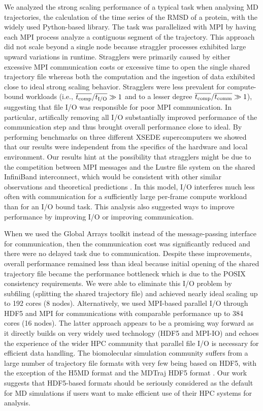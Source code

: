 \label{concl} 
We analyzed the strong scaling performance of a typical task when analysing MD trajectories, the calculation of the time series of the RMSD of a protein, with the widely used Python-based  library.
The task was parallelized with MPI by having each MPI process analyze a contiguous segment of the trajectory.
This approach did not scale beyond a single node because straggler processes exhibited large upward variations in runtime.
Stragglers were primarily caused by either excessive MPI communication costs or excessive time to open the single shared trajectory file whereas both the computation and the ingestion of data exhibited close to ideal strong scaling behavior.
Stragglers were less prevalent for compute-bound workloads (i.e., $\overline{{t}_{\text{comp}}}/\overline{{t}_{\text{I/O}}} \gg 1$ and to a lesser degree $\overline{{t}_{\text{comp}}}/\overline{t_{\text{comm}}} \gg 1$), suggesting that file I/O was responsible for poor MPI communication.
In particular, artifically removing all I/O substantially improved performance of the communication step and thus brought overall performance close to ideal.
By performing benchmarks on three different XSEDE supercomputers we showed that our results were independent from the specifics of the hardware and local environment.
Our results hint at the possibility that stragglers might be due to the competition between MPI messages and the Lustre file system on the shared InfiniBand interconnect, which would be consistent with other similar observations \cite{VMD2013, Kevin2018} and theoretical predictions \cite{Brown:2018ab}.
In this model, I/O interferes much less often with communication for a sufficiently large per-frame compute workload than for an I/O bound task.
This analysis also suggested ways to improve performance by improving I/O or improving communication.

When we used the Global Arrays toolkit instead of the message-passing interface for communication, then the communication cost was significantly reduced and there were no delayed task due to communication.
Despite these improvements, overall performance remained less than ideal because initial opening of the shared trajectory file became the performance bottleneck which is due to the POSIX consistency requirements.
We were able to eliminate this I/O problem by subfiling (splitting the shared trajectory file) and achieved nearly ideal scaling up to 192 cores (8 nodes).
Alternatively, we used MPI-based parallel I/O through HDF5 and MPI for communications with comparable performance up to 384 cores (16 nodes). 
The latter approach appears to be a promising way forward as it directly builds on very widely used technology (HDF5 and MPI-IO) and echoes the experience of the wider HPC community that parallel file I/O is necessary for efficient data handling.
The biomolecular simulation community suffers from a large number of trajectory file formats with very few being based on HDF5, with the exception of the H5MD format \cite{Buyl:2014aa} and the MDTraj HDF5 format \cite{McGibbon:2015aa}.
Our work suggests that HDF5-based formats should be seriously considered as the default for MD simulations if users want to make efficient use of their HPC systems for analysis. 


